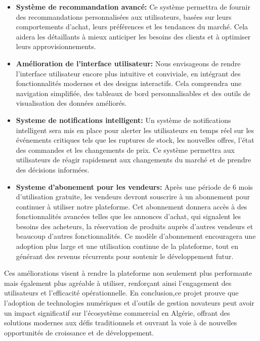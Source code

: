 \documentclass[edit,12pt,a4paper,ChapStyle,oneside,doubleinterligne]{report}
\begin{document}
\begin{itemize}
    \item \textbf{Système de recommandation avancé: }Ce système permettra de fournir des recommandations personnalisées aux utilisateurs, basées sur leurs comportements d'achat, leurs préférences et les tendances du marché. Cela aidera les détaillants à mieux anticiper les besoins des clients et à optimiser leurs approvisionnements.
    \item \textbf{Amélioration de l'interface utilisateur: }Nous envisageons de rendre l'interface utilisateur encore plus intuitive et conviviale, en intégrant des fonctionnalités modernes et des designs interactifs. Cela comprendra une navigation simplifiée, des tableaux de bord personnalisables et des outils de visualisation des données améliorés.
    \item \textbf{Systeme de notifications intelligent: }Un système de notifications intelligent sera mis en place pour alerter les utilisateurs en temps réel sur les événements critiques tels que les ruptures de stock, les nouvelles offres, l’état des commandes et les changements de prix. Ce système permettra aux utilisateurs de réagir rapidement aux changements du marché et de prendre des décisions informées.
    \item \textbf{Systeme d’abonement pour les vendeurs: }Après une période de 6 mois d'utilisation gratuite, les vendeurs devront souscrire à un abonnement pour continuer à utiliser notre plateforme. Cet abonnement donnera accès à des fonctionnalités avancées telles que les annonces d'achat, qui signalent les besoins des acheteurs, la réservation de produits auprès d'autres vendeurs et beaucoup d'autres fonctionnalités. Ce modèle d’abonnement encouragera une adoption plus large et une utilisation continue de la plateforme, tout en générant des revenus récurrents pour soutenir le développement futur.
\end{itemize}

Ces améliorations visent à rendre la plateforme non seulement plus performante mais également plus agréable à utiliser, renforçant ainsi l'engagement des utilisateurs et l'efficacité opérationnelle.
\newline \newline 
En conclusion,ce projet prouve que l'adoption de technologies numériques et d'outils de gestion novateurs peut avoir un impact significatif sur l'écosystème commercial en Algérie, offrant des solutions modernes aux défis traditionnels et ouvrant la voie à de nouvelles opportunités de croissance et de développement.
\end{document}
